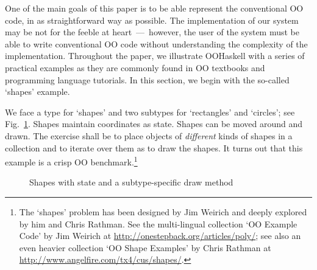 \documentclass{jfp}
\begin{document}
One of the main goals of this paper is to be able represent the
conventional OO code, in as straightforward way as possible.  The
implementation of our system may be not for the feeble at
heart~---~however, the user of the system must be able to write
conventional OO code without understanding the complexity of the
implementation. Throughout the paper, we illustrate OOHaskell with a
series of practical examples as they are commonly found in OO
textbooks and programming language tutorials. In this section, we
begin with the so-called `shapes' example.

We face a type for `shapes' and two subtypes for `rectangles' and
`circles'; see Fig.~\ref{F:shapes}. Shapes maintain coordinates as
state. Shapes can be moved around and drawn. The exercise shall be to
place objects of \emph{different} kinds of shapes in a collection and
to iterate over them as to draw the shapes. It turns out that this
example is a crisp OO benchmark.\footnote{The `shapes' problem
has been designed by Jim Weirich and deeply explored by him and Chris
Rathman. See the multi-lingual collection `OO Example Code' by Jim
Weirich at \url{http://onestepback.org/articles/poly/}; see also an
even heavier collection `OO Shape Examples' by Chris Rathman at
\url{http://www.angelfire.com/tx4/cus/shapes/}.}






\begin{figure}[t!]
\bigskip
\begin{center}
\end{center}
\caption{Shapes with state and a subtype-specific draw method}
\label{F:shapes}
\bigskip
\end{figure}
\end{document}
